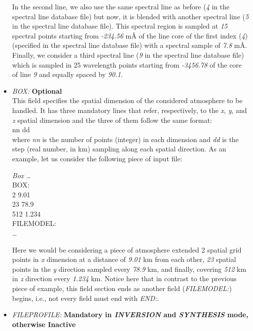 \begin{itemize}
  In the second line, we also use the same spectral line as before ({\it 4} in the spectral line database file) but now, it is blended with another spectral line ({\it 5} in the spectral line database file). This spectral region is sampled at {\it 15} spectral points starting from {\it -234.56} m{\AA} of the line core of the first index ({\it 4}) (specified in the spectral line database file) with a spectral sample of {\it 7.8} m{\AA}.
  Finally, we consider a third spectral line ({\it 9} in the spectral line database file) which is sampled in 25 wavelength points starting from {\it -3456.78} of the core of line {\it 9} and equally spaced by {\it 90.1}.\\
  \item {\it BOX:} {\bf Optional}\\
  This field specifies the spatial dimension of the considered atmosphere to be handled. It has three mandatory lines that refer, respectively, to the {\it x}, {\it y}, and {\it z} spatial dimension and the three of them follow the same format:\\
  nn   dd\\
  where {\it nn} is the number of points (integer) in each dimension and {\it dd } is the step (real number, in km) sampling along each spatial direction. As an example, let us consider the following piece of input file:\\
\begin{ifbox}[label={tb:box}]{{\it Box}}
  \scriptsize
  \ldots\\
  BOX:\\
  2  9.01\\
  23  78.9\\
  512  1.234\\
  FILEMODEL:\\
  \ldots
  \normalsize
\end{ifbox}
  Here we would be considering a piece of atmosphere extended 2 spatial grid points in {\it x} dimension at a distance of {\it 9.01} km from each other, {\it 23 } spatial points in the {\it y} direction sampled every {\it 78.9} km, and finally, covering {\it 512} km in {\it z} direction every {\it 1.234} km. Notice here that in contrast to the previous piece of example, this field section ends as another field ({\it FILEMODEL:}) begins, i.e., not every field must end with {\it END:}.\\
  \item {\it FILEPROFILE:} {\bf Mandatory in {\it INVERSION} and {\it SYNTHESIS} mode, otherwise Inactive}\\

\end{itemize}
